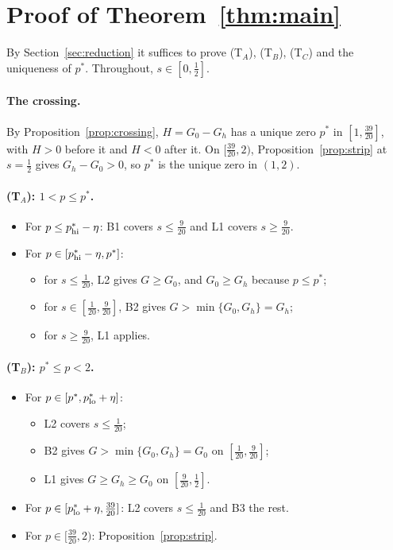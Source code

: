 \documentclass[11pt]{article}
\theoremstyle{remark}
\begin{document}
\section{\texorpdfstring{Proof of Theorem~\ref{thm:main}}{Proof of the main theorem}}\label{sec:assembly}
By Section~\ref{sec:reduction} it suffices to prove (T$_A$), (T$_B$), (T$_C$) and the uniqueness of $p^*$. Throughout, $s\in[0,\frac12]$.

\paragraph{The crossing.} By Proposition~\ref{prop:crossing}, $H=G_0-G_h$ has a unique zero $p^*$ in $[1,\frac{39}{20}]$, with $H>0$ before it and $H<0$ after it. On $[\frac{39}{20},2)$, Proposition~\ref{prop:strip} at $s=\frac12$ gives $G_h-G_0>0$, so $p^*$ is the unique zero in $(1,2)$.

\paragraph{(T$_A$): $1<p\le p^*$.}
\begin{itemize}
\item For $p\le p^*_{\rm hi}-\eta$: B1 covers $s\le\frac9{20}$ and L1 covers $s\ge\frac9{20}$.
\item For $p\in[p^*_{\rm hi}-\eta,p^*]$:
  \begin{itemize}
  \item for $s\le\frac1{20}$, L2 gives $G\ge G_0$, and $G_0\ge G_h$ because $p\le p^*$;
  \item for $s\in[\frac1{20},\frac9{20}]$, B2 gives $G>\min\{G_0,G_h\}=G_h$;
  \item for $s\ge\frac9{20}$, L1 applies.
  \end{itemize}
\end{itemize}

\paragraph{(T$_B$): $p^*\le p<2$.}
\begin{itemize}
\item For $p\in[p^*,p^*_{\rm lo}+\eta]$:
  \begin{itemize}
  \item L2 covers $s\le\frac1{20}$;
  \item B2 gives $G>\min\{G_0,G_h\}=G_0$ on $[\frac1{20},\frac9{20}]$;
  \item L1 gives $G\ge G_h\ge G_0$ on $[\frac9{20},\frac12]$.
  \end{itemize}
\item For $p\in[p^*_{\rm lo}+\eta,\frac{39}{20}]$: L2 covers $s\le\frac1{20}$ and B3 the rest.
\item For $p\in[\frac{39}{20},2)$: Proposition~\ref{prop:strip}.
\end{itemize}
\end{document}
